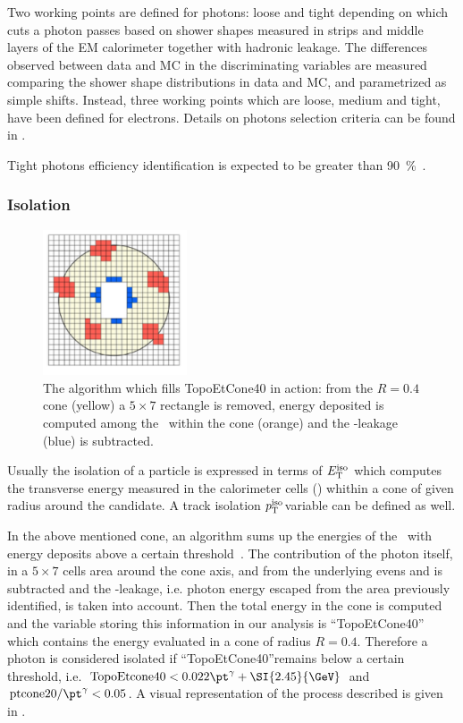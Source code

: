 Two working points are defined for photons: loose and tight depending on which cuts a photon passes based on shower shapes measured in strips and middle layers of the EM calorimeter together with hadronic leakage. The differences observed between data and MC in the discriminating variables are measured comparing the shower shape distributions in data and MC, and parametrized as simple shifts. Instead, three working points which are loose, medium and tight, have been defined for electrons. Details on photons selection criteria can be found in \cite[Sect. 4]{photons}.

Tight photons efficiency identification is expected to be greater than \SI{90}{\percent}~\cite{photonsISO}.

\subsubsection{Isolation}
\label{sec:phisolation}
\begin{figure}[tp]
\centering
\includegraphics[width=0.38\textwidth]{MCSample/topoetcone40}
\caption{The algorithm which fills TopoEtCone40 in action: from the $R=0.4$ cone (yellow) a $5\times7$ rectangle is removed, energy deposited is computed among the \topo~within the cone (orange) and the \pt-leakage (blue) is subtracted.}
\label{topoetcone40}
\end{figure}

Usually the isolation of a particle is expressed in terms of $E_\textup{T}^{\textup{iso}}$ which computes the transverse energy measured in the calorimeter cells (\topo) whithin a cone of given radius around the candidate. A track isolation $p_\textup{T}^{\textup{iso}}$variable can be defined as well.

In the above mentioned cone, an algorithm sums up the energies of the \topo~with energy deposits above a certain threshold~\cite{photonsISO}. The contribution of the photon itself, in a $5\times7$ cells area around the cone axis, and from the underlying evens and \pileup is  subtracted and the \pt-leakage, i.e. photon energy escaped from the area previously identified, is taken into account. Then the total energy in the cone is computed and the variable storing this information in our analysis is ``TopoEtCone40'' which contains the energy evaluated in a cone of radius $R=0.4$. Therefore a photon is considered isolated if ``TopoEtCone40''remains below a certain threshold, i.e. $\text{TopoEtcone40} < 0.022\pt^\gamma + \SI{2.45}{\GeV}$ and $\text{ptcone20}/\pt^\gamma<0.05$. A visual representation of the process described is given in \Fig{\ref{topoetcone40}}.


